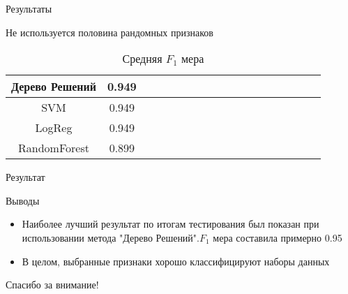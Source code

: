 \documentclass{beamer}
\begin{document}
\begin{frame}{Результаты}
\begin{block}{Не используется половина рандомных признаков}
	\begin{table}[!h]
		\centering
		\caption{Средняя $F_1$ мера}
		\label{my-label}
		\begin{tabular}{|*{18}{c|}}\hline
			Дерево Решений & 0.949\\\hline
			SVM &  0.949  \\\hline
			LogReg & 0.949  \\\hline
			RandomForest &0.899 \\\hline
		\end{tabular}
	\end{table}
\end{block}
\end{frame}

\begin{frame}{Результат}
\begin{block}{Выводы}
\begin{itemize}
\item Наиболее лучший результат по итогам тестирования был показан при использовании метода "Дерево Решений".$F_1$ мера составила примерно 0.95
\item В целом, выбранные признаки хорошо классифицируют наборы данных
\end{itemize}
\end{block}
\end{frame}

\begin{frame}{}
\begin{center}
Спасибо за внимание!
\end{center}
\end{frame}

\appendix

%
\end{document}
